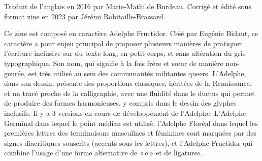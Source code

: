 Traduit de l’anglais en 2016 par Marie-Mathilde Burdeau. Corrigé et édité sous format zine en 2023 par Jérémi Robitaille-Brassard.

{\tiny Ce zine est composé en caractère Adelphe Fructidor. Créé par Eugénie Bidaut, ce caractère a pour enjeu principal de proposer plusieurs manières de pratiquer l’écriture inclusive sur du texte long, en petit corps, et sans altération du gris typographique. Son nom, qui signifie à la fois frère et sœur de manière non-genrée, est très utilisé au sein des communautés militantes queers. L’Adelphe, dans son dessin, présente des proportions classiques, héritées de la Renaissance, et un tracé proche de la calligraphie, avec une fluidité dans le ductus qui permet de produire des formes harmonieuses, y compris dans le dessin des glyphes inclusifs. Il y a 3 versions en cours de développement de l’Adelphe. L’Adelphe Germinal dans lequel le point médian est utilisé, l’Adelphe Floréal dans lequel les premières lettres des terminaisons masculines et féminines sont marquées par des signes diacritiques souscrits (accents sous les lettres), et l’Adelphe Fructidor qui combine l’usage d’une forme alternative de « e » et de ligatures.}
